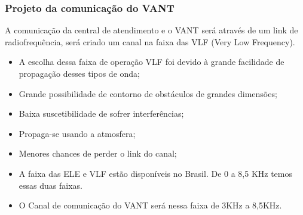 \subsubsection{Projeto da comunicação do VANT}
A comunicação da central de atendimento e o VANT será através de um link de radiofrequência, será criado um canal na faixa das VLF (Very Low Frequency).

\begin{itemize}
	\item A escolha dessa faixa de operação VLF foi devido à grande facilidade de propagação desses tipos de onda;
	\item Grande possibilidade de contorno de obstáculos de grandes dimensões;
	\item Baixa suscetibilidade de sofrer interferências;
	\item Propaga-se usando a atmosfera;
	\item Menores chances de perder o link do canal;
	\item A faixa das ELE e VLF estão disponíveis no Brasil. De 0 a 8,5 KHz temos essas duas faixas.
	\item O Canal de comunicação do VANT será nessa faixa de 3KHz a 8,5KHz.
\end{itemize}

\pagebreak
